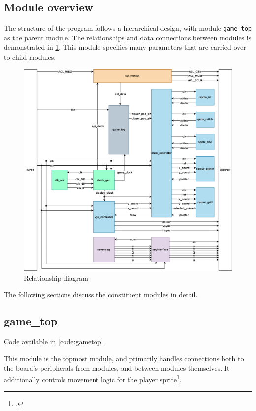 \subsection{Module overview}
The structure of the program follows a hierarchical design, with module \lstinline{game_top} as the 
parent module. The relationships and data connections between modules is demonstrated in \cref{fig:relationship}. 
This module specifies many parameters that are carried over to child modules.
\begin{figure}[H]
    \centering
    \includegraphics[width=\textwidth,height=0.5\textheight,keepaspectratio]{./figures/relationship.png}
    \caption{Relationship diagram}\label{fig:relationship}
\end{figure}
The following sections discuss the constituent modules in detail. 

\subsection{game\_top}\label{sec:gametop}
Code available in \cref{code:gametop}.

This module is the topmost module, and primarily handles connections both to the board's peripherals 
from modules, and between modules themselves. It additionally controls movement logic for the 
player sprite\footnote{
    .
}.


